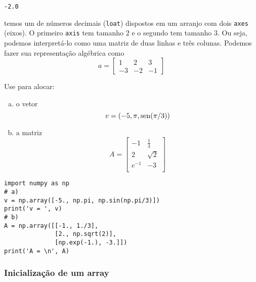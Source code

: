 \begin{verbatim}
-2.0
\end{verbatim}

temos um {\PYTHONnumpyDOTarray} de números decimais (\texttt{loat}) dispostos em um arranjo com dois \texttt{axes} (eixos). O primeiro \texttt{axis} tem tamanho $2$ e o segundo tem tamanho $3$. Ou seja, podemos interpretá-lo como uma matriz de duas linhas e três colunas. Podemos fazer sua representação algébrica como
\begin{equation}
  a =
  \begin{bmatrix}
    1 & 2 & 3\\
    -3 & -2 & -1 
  \end{bmatrix}
\end{equation}

\begin{exer}
Use {\PYTHONnumpyDOTarray} para alocar:
\begin{enumerate}[a)]
  \item o vetor
  \begin{equation}
    v = \left(-5, \pi, \operatorname{sen}(\pi/3)\right)
  \end{equation}
  \item a matriz
  \begin{equation}
    A = \begin{bmatrix}
    -1 & \displaystyle\frac{1}{3}\\[1em]
    2 & \displaystyle\sqrt{2}\\[1em]
    \displaystyle e^{-1} & -3\\
    \end{bmatrix}
  \end{equation}
\end{enumerate}
\end{exer}
\begin{resp}
  
\begin{lstlisting}
import numpy as np
# a)
v = np.array([-5., np.pi, np.sin(np.pi/3)])
print('v = ', v)
# b)
A = np.array([[-1., 1./3],
              [2., np.sqrt(2)],
              [np.exp(-1.), -3.]])
print('A = \n', A)  
\end{lstlisting}

\end{resp}

\subsubsection{Inicialização de um array}\label{subsubsection:iniarray}

